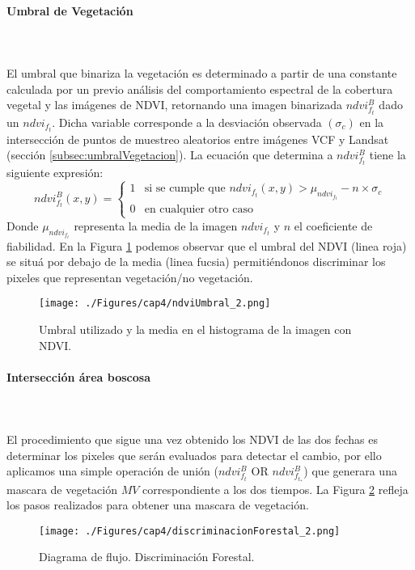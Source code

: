 \paragraph{Umbral de Vegetaci\'on}\label{sec:uvegetacion}\mbox{}\\\mbox{}\\
El umbral que binariza la vegetaci\'on es determinado a partir de una constante calculada por un previo an\'alisis del comportamiento espectral de la cobertura vegetal y las im\'agenes de NDVI, retornando una imagen binarizada $ ndvi_{f_{t}}^{B} $ dado un $ ndvi_{f_{t}} $. Dicha variable corresponde a la desviaci\'on observada $(\sigma_{c}) $ en la intersecci\'on de puntos de muestreo aleatorios entre im\'agenes VCF y Landsat (secci\'on \ref{subsec:umbralVegetacion}). La ecuaci\'on que determina a $ ndvi_{f_{t}}^{B} $ tiene la siguiente expresi\'on:
  \begin{equation}\label{ec:umbVegetacion}
  ndvi_{f_{t}}^{B}(x,y) = \begin{cases}
  1 & \text{si se cumple que } ndvi_{f_{t}}(x,y) > \mu_{ndvi_{f_{t}}}-n \times \sigma_{c}  \\
  0 & \text{en cualquier otro caso }
  \end{cases}
  \end{equation}
Donde $ \mu_{ndvi_{f_{t}}} $ representa la media de la imagen $ ndvi_{f_{t}} $ y $ n $ el coeficiente de fiabilidad. En la Figura \ref{fig:ndviUmbral} podemos observar que el umbral del NDVI (linea roja) se situ\'a por debajo de la media (linea fucsia) permiti\'endonos discriminar los pixeles que representan vegetaci\'on/no vegetaci\'on.
\begin{figure}[H]
	\centering
	\texttt{[image: ./Figures/cap4/ndviUmbral\_2.png]}
	\caption{Umbral utilizado y la media en el histograma de la imagen con NDVI.}
	\label{fig:ndviUmbral}
\end{figure}

\paragraph{Intersecci\'on \'area boscosa }\mbox{}\\\mbox{}\\
El procedimiento que sigue una vez obtenido los NDVI de las dos fechas es determinar los pixeles que ser\'an evaluados para detectar el cambio, por ello aplicamos una simple operaci\'on de uni\'on ($ ndvi_{f_{t}}^{B} $ OR $ ndvi_{f_{t_{*}}}^{B}$) que generara una mascara de vegetaci\'on $ MV $ correspondiente a los dos tiempos. La Figura \ref{fig:discrimForestal} refleja los pasos realizados para obtener una mascara de vegetaci\'on.
\begin{figure}[H]
	\centering
	\texttt{[image: ./Figures/cap4/discriminacionForestal\_2.png]}
	\caption{Diagrama de flujo. Discriminaci\'on Forestal.}
	\label{fig:discrimForestal}
\end{figure}


